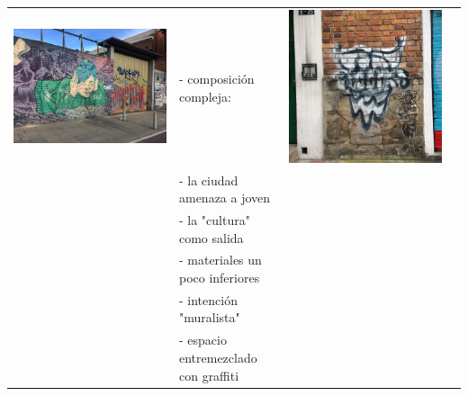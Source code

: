 \documentclass[11pt]{article}
\begin{document}
\begin{center}
\begin{tabular}{llll}
\includegraphics[width=.9\linewidth]{./graffitti/mural_chapinero.JPG} & - composición compleja: & \includegraphics[width=.9\linewidth]{./graffitti/gffti4.JPG} & \\
 & - la ciudad amenaza a joven &  & \\
 & - la "cultura" como salida &  & \\
 & - materiales un poco inferiores &  & \\
 & - intención "muralista" &  & \\
 & - espacio entremezclado con graffiti &  & \\
\hline

\end{tabular}
\end{center}
\end{document}

